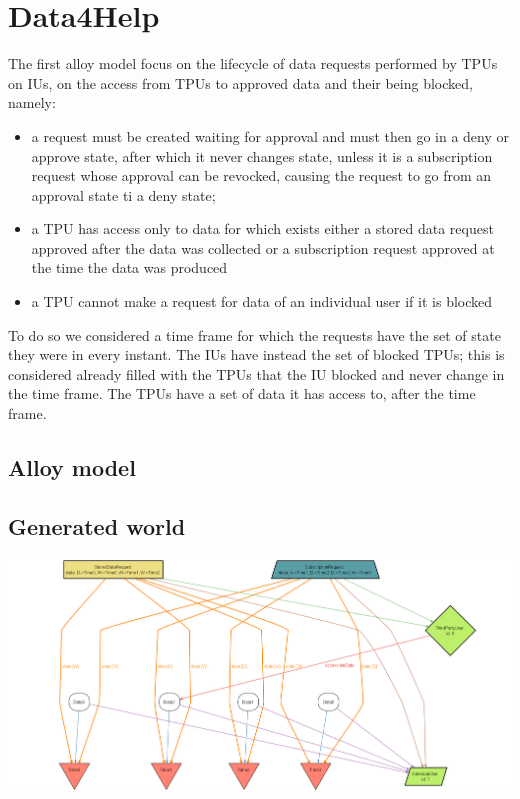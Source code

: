 \section{Data4Help}
The first alloy model focus on the lifecycle of data requests performed by TPUs on IUs, on the access from TPUs to approved data and their being blocked, namely:
\begin{itemize}
\item a request must be created waiting for approval and must then go in a deny or approve state, after which it never changes state, unless it is a subscription request whose approval can be revocked, causing the request to go from an approval state ti a deny state;
\item a TPU has access only to data for which exists either a stored data request approved after the data was collected or a subscription request approved at the time the data was produced
\item a TPU cannot make a request for data of an individual user if it is blocked
\end{itemize}
To do so we considered a time frame for which the requests have the set of state they were in every instant. 
The IUs have instead the set of blocked TPUs; this is considered already filled with the TPUs that the IU blocked and never change in the time frame.
The TPUs have a set of data it has access to, after the time frame.
\subsection{Alloy model}

\subsection{Generated world}
\includegraphics[width = 0.8\textheight, angle=90]{sections/alloy/GenWorldD4H.png}
